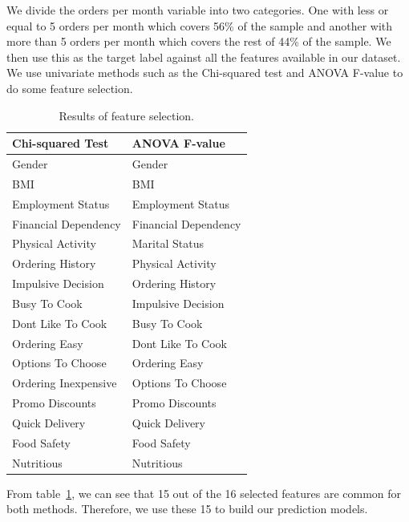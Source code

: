\documentclass[a4paper,fleqn]{cas-sc}
\begin{document}
We divide the orders per month variable into two categories. One with less or equal to 5 orders per month which covers 56\% of the sample and another with more than 5 orders per month which covers the rest of 44\% of the sample. We then use this as the target label against all the features available in our dataset. We use univariate methods such as the Chi-squared test and ANOVA F-value to do some feature selection.

\begin{table}[htb]
\caption{Results of feature selection.}
\label{tab:feature_selection}
\begin{tabular*}{\linewidth}{@{\extracolsep{\fill}}ll@{}}
\toprule
Chi-squared Test     & ANOVA F-value            \\ 
\midrule
Gender               & Gender                   \\
BMI                  & BMI                      \\
Employment Status    & Employment Status        \\
Financial Dependency & Financial Dependency     \\
Physical Activity    & Marital Status           \\
Ordering History     & Physical Activity        \\
Impulsive Decision   & Ordering History         \\
Busy To Cook         & Impulsive Decision       \\
Dont Like To Cook    & Busy To Cook             \\
Ordering Easy        & Dont Like To Cook        \\
Options To Choose    & Ordering Easy            \\
Ordering Inexpensive & Options To Choose        \\
Promo Discounts      & Promo Discounts          \\
Quick Delivery       & Quick Delivery           \\
Food Safety          & Food Safety              \\
Nutritious           & Nutritious               \\ 
\bottomrule
\end{tabular*}
\end{table}

From table~\ref{tab:feature_selection}, we can see that 15 out of the 16 selected features are common for both methods. Therefore, we use these 15 to build our prediction models. 
\end{document}
